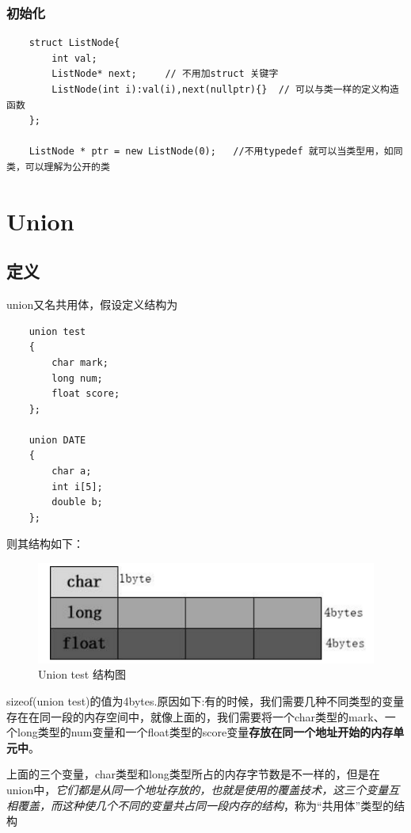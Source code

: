 \documentclass[UTF8,a4paper,12pt]{ctexbook} %
\begin{document}
		    \subsubsection{初始化}
			\begin{lstlisting}
	struct ListNode{
		int val;
		ListNode* next;		// 不用加struct 关键字
		ListNode(int i):val(i),next(nullptr){}	// 可以与类一样的定义构造函数
	};
	
	ListNode * ptr = new ListNode(0);	//不用typedef 就可以当类型用，如同类，可以理解为公开的类			
			\end{lstlisting} 
         
	\section{Union}     
        \subsection{定义} 
	        union又名共用体，假设定义结构为
	        \begin{lstlisting}
	union test
	{
		char mark;
		long num;
		float score;
	};
	
	union DATE
	{
		char a;
		int i[5];
		double b;
	};        
	        \end{lstlisting}
	        
	        则其结构如下：
	        \begin{figure}[H]
	        	\centering
	        	\includegraphics[width = 12cm]{union.png}
	        	\caption{Union test 结构图}
	        \end{figure} 
	        
	        sizeof(union test)的值为4bytes.原因如下:有的时候，我们需要几种不同类型的变量存在在同一段的内存空间中，就像上面的，我们需要将一个char类型的mark、一个long类型的num变量和一个float类型的score变量\textbf{存放在同一个地址开始的内存单元中}。
	        
	        上面的三个变量，char类型和long类型所占的内存字节数是不一样的，但是在union中，\textit{它们都是从同一个地址存放的，也就是使用的覆盖技术，这三个变量互相覆盖，而这种使几个不同的变量共占同一段内存的结构}，称为“共用体”类型的结构
	        
\end{document}
